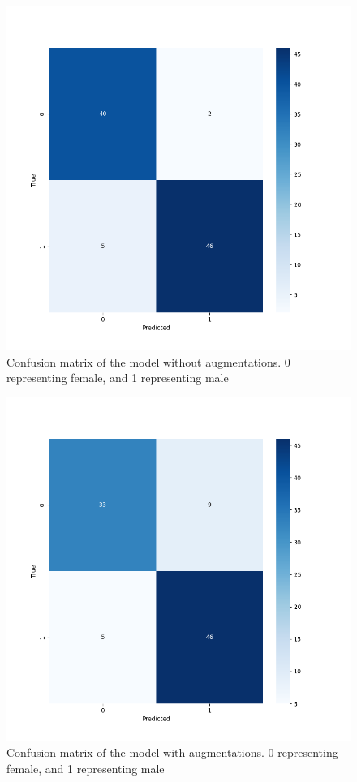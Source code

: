 \documentclass[10pt,twocolumn,letterpaper]{article}
\begin{document}
\begin{figure}[h!]
    \centering
    \includegraphics[width=1\linewidth]{image.png}
    \caption{Confusion matrix of the model without augmentations. 0 representing female, and 1 representing male }
    \label{fig:og_confusion}
\end{figure}
\begin{figure}[h!]
    \centering
    \includegraphics[width=1\linewidth]{image_1.png}
    \caption{Confusion matrix of the model with augmentations. 0 representing female, and 1 representing male}
    \label{fig:augmented}
\end{figure}
\end{document}
